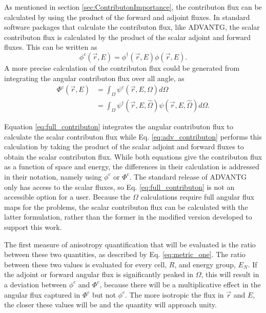 As mentioned in section \ref{sec:ContributonImportance}, the
contributon flux can be calculated by using
the product of the forward and adjoint fluxes. In standard software packages
that calculate the contributon flux, like ADVANTG, the scalar contributon flux is calculated by the product
of the scalar adjoint and forward fluxes. This can be written as
%
\begin{equation}
  \phi^{c}(\vec {r} ,E)  = \phi^{\dagger}(\vec {r} ,E)\phi(\vec {r} ,E) .
\label{eq:adv_contributon}
\end{equation}
%
A more precise calculation of the contributon flux could be generated from
integrating the angular contributon flux over all angle, as
%
\begin{equation}
  \begin{split}
    \Phi^{c}(\vec {r} ,E)  & = \int_{\Omega}{\psi^{c}(\vec{r}, E,\Omega)}
                               d\Omega \\
             & = \int_{\Omega}{\psi^{\dagger}(\vec{r}, E, \hat\Omega)
                 \psi(\vec{r}, E, \hat\Omega)} d\Omega .
  \end{split}
\label{eq:full_contributon}
\end{equation}

Equation \ref{eq:full_contributon} integrates the angular contributon flux
to calculate the scalar contributon flux
while Eq. \ref{eq:adv_contributon} performs this calculation by taking
the product of the scalar
adjoint and forward fluxes to obtain the scalar contributon flux. While both
equations give the contributon flux as a function of space and energy, the
differences in their calculation is addressed in their notation, namely using
$\phi^{c}$ or $\Phi^{c}$. The standard release of ADVANTG only has
access to the scalar
fluxes, so Eq. \ref{eq:full_contributon} is not an accessible option for a
user. Because the $\Omega$ calculations require full angular flux maps for the
problems, the scalar contributon flux can be calculated with the latter
formulation, rather than the former in the modified version developed to support
this work.

The first measure of anisotropy quantification that will be evaluated is the
ratio between these two quantities, as described by Eq. \ref{eq:metric_one}.
The ratio between these two values is evaluated for every cell, $R$, and energy
group, $E_N$.
If the adjoint or forward angular flux is significantly
peaked in $\Omega$, this will result in a deviation between $\phi^{c}$ and
$\Phi^{c}$, because there will be a multiplicative effect in the angular flux
captured in $\Phi^{c}$ but not $\phi^{c}$. The more isotropic the
flux in $\vec{r}$ and $E$, the closer these
values will be and the quantity will approach unity.

